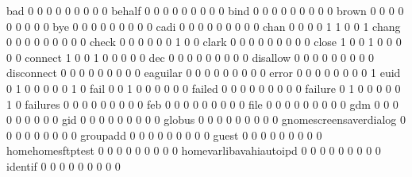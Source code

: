 \documentclass[compress,8pt]{beamer}
\begin{document}
\begin{frame}
\begin{Schunk}
  bad                                        0   0   0   0   0   0   0   0   0
  behalf                                     0   0   0   0   0   0   0   0   0
  bind                                       0   0   0   0   0   0   0   0   0
  brown                                      0   0   0   0   0   0   0   0   0
  bye                                        0   0   0   0   0   0   0   0   0
  cadi                                       0   0   0   0   0   0   0   0   0
  chan                                       0   0   0   0   1   1   0   0   1
  chang                                      0   0   0   0   0   0   0   0   0
  check                                      0   0   0   0   0   0   1   0   0
  clark                                      0   0   0   0   0   0   0   0   0
  close                                      1   0   0   1   0   0   0   0   0
  connect                                    1   0   0   1   0   0   0   0   0
  dec                                        0   0   0   0   0   0   0   0   0
  disallow                                   0   0   0   0   0   0   0   0   0
  disconnect                                 0   0   0   0   0   0   0   0   0
  eaguilar                                   0   0   0   0   0   0   0   0   0
  error                                      0   0   0   0   0   0   0   0   1
  euid                                       0   1   0   0   0   0   0   1   0
  fail                                       0   0   1   0   0   0   0   0   0
  failed                                     0   0   0   0   0   0   0   0   0
  failure                                    0   1   0   0   0   0   0   1   0
  failures                                   0   0   0   0   0   0   0   0   0
  feb                                        0   0   0   0   0   0   0   0   0
  file                                       0   0   0   0   0   0   0   0   0
  gdm                                        0   0   0   0   0   0   0   0   0
  gid                                        0   0   0   0   0   0   0   0   0
  globus                                     0   0   0   0   0   0   0   0   0
  gnomescreensaverdialog                     0   0   0   0   0   0   0   0   0
  groupadd                                   0   0   0   0   0   0   0   0   0
  guest                                      0   0   0   0   0   0   0   0   0
  homehomesftptest                           0   0   0   0   0   0   0   0   0
  homevarlibavahiautoipd                     0   0   0   0   0   0   0   0   0
  identif                                    0   0   0   0   0   0   0   0   0

\end{Schunk}
\end{frame}
\end{document}
